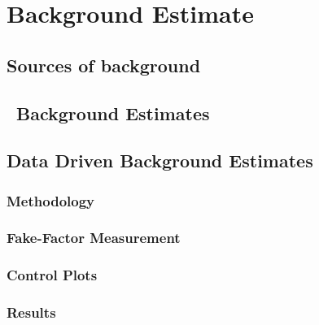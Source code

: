 \graphicspath{{Chapters/BackgroundEstimate/Figures/}}
\chapter{Background Estimate}
\label{chap:BackgroundEstimate}
\section{Sources of background}
\section{\mc\ Background Estimates}
\section{Data Driven Background Estimates}
\subsection{Methodology}
\subsection{Fake-Factor Measurement}
\subsection{Control Plots}
\subsection{Results}
